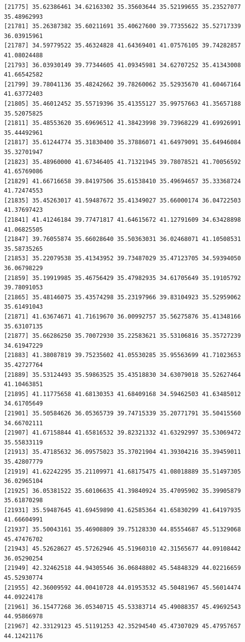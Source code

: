 \documentclass[
  letterpaper,
  DIV=11,
  numbers=noendperiod]{scrartcl}
\begin{document}
\begin{verbatim}
[21775] 35.62386461 34.62163302 35.35603644 35.52199655 35.23527077 35.48962993
[21781] 35.26387382 35.60211691 35.40627600 39.77355622 35.52717339 36.03915961
[21787] 34.59779522 35.46324828 41.64369401 41.07576105 39.74282857 41.08024488
[21793] 36.03930149 39.77344605 41.09345981 34.62707252 35.41343008 41.66542582
[21799] 39.78041136 35.48242662 39.78260062 35.52935670 41.60467164 41.63772403
[21805] 35.46012452 35.55719396 35.41355127 35.99757663 41.35657188 35.52075825
[21811] 35.48553620 35.69696512 41.38423998 39.73968229 41.69926991 35.44492961
[21817] 35.61244774 35.31830400 35.37886071 41.64979091 35.64946084 35.32701947
[21823] 35.48960000 41.67346405 41.71321945 39.78078521 41.70056592 41.65769086
[21829] 41.66716658 39.84197506 35.61538410 35.49694657 35.33368724 41.72474553
[21835] 35.45263017 41.59487672 35.41349027 35.66000174 36.04722503 41.37697423
[21841] 41.41246184 39.77471817 41.64615672 41.12791609 34.63428898 41.06825505
[21847] 39.76055874 35.66028640 35.50363031 36.02468071 41.10508531 35.58735265
[21853] 35.22079538 35.41343952 39.73487029 35.47123705 34.59394050 36.06798229
[21859] 35.19919985 35.46756429 35.47982935 34.61705649 35.19105792 39.78091053
[21865] 35.48146075 35.43574298 35.23197966 39.83104923 35.52959062 35.61491043
[21871] 41.63674671 41.71619670 36.00992757 35.56275876 35.41348166 35.63107135
[21877] 35.66286250 35.70072930 35.22583621 35.53106816 35.35727239 34.61947229
[21883] 41.38087819 39.75235602 41.05530285 35.95563699 41.71023653 35.42727764
[21889] 35.53124493 35.59863525 35.43518830 34.63079018 35.52627464 41.10463851
[21895] 41.11775658 41.68130353 41.68409168 34.59462503 41.63485012 34.61705649
[21901] 35.50584626 36.05365739 39.74715339 35.20771791 35.50415560 34.66702111
[21907] 41.67158844 41.65816532 39.82321332 41.63292997 35.53069472 35.55833119
[21913] 35.47185632 36.09575023 35.37021904 41.39304216 35.39459011 35.42807779
[21919] 41.62242295 35.21109971 41.68175475 41.08018889 35.51497305 36.02965104
[21925] 36.05381522 35.60106635 41.39840924 35.47095902 35.39905879 35.61870298
[21931] 35.59487645 41.69459890 41.62585364 41.65830299 41.64197935 41.66604991
[21937] 35.50043161 35.46908809 39.75128330 44.85554687 45.51329068 45.47476702
[21943] 45.52628627 45.57262946 45.51960310 42.31565677 44.09108442 36.05290254
[21949] 42.32462518 44.94305546 36.06848802 45.54848329 44.02216659 45.52930774
[21955] 42.36009592 44.00410728 44.01953532 45.50481967 45.56014474 44.09224178
[21961] 36.15477268 36.05340715 45.53383714 45.49088357 45.49692543 44.95866978
[21967] 42.33129123 45.51191253 42.35294540 45.47307029 45.47957657 44.12421176

\end{verbatim}
\end{document}
